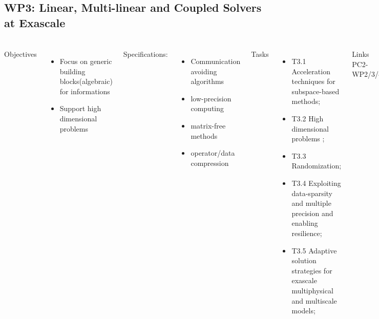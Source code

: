 \subsection{WP3: Linear, Multi-linear and Coupled Solvers at Exascale}
\begin{frame}
  \frametitle{\insertsectionhead}
  \framesubtitle{\insertsubsectionhead}
  \footnotesize
  \begin{columns}[t]
    Objectives
    \begin{itemize}
      \item Focus on generic building blocks(algebraic) for informations
      \item Support high dimensional problems
    \end{itemize}
    Specifications: 
    \begin{itemize}
      \item Communication avoiding algorithms
      \item low-precision computing
      \item matrix-free methods
      \item operator/data compression
    \end{itemize}
    Tasks
    \begin{itemize}
      \item T3.1 Acceleration techniques for subspace-based methods;
      \item T3.2 High dimensional problems ;
      \item T3.3 Randomization;
      \item T3.4 Exploiting data-sparsity and multiple precision and enabling resilience;
      \item T3.5 Adaptive solution strategies for exascale multiphysical and multiscale models;
    \end{itemize}
    \begin{alertblock}{Links}
    PC2-WP2/3/4 
  \end{alertblock}
  \end{columns}
\end{frame}

